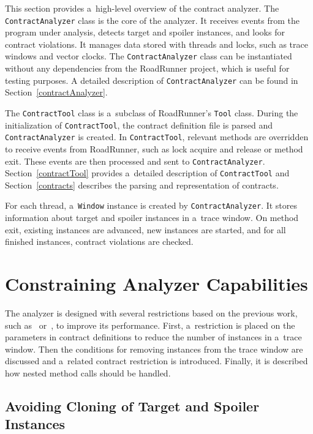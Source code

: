 This section provides a~high-level overview of the contract analyzer. The
\texttt{ContractAnalyzer} class is the core of the analyzer. It receives events
from the program under analysis, detects target and spoiler instances, and looks
for contract violations. It manages data stored with threads and locks, such as
trace windows and vector clocks. The \texttt{ContractAnalyzer} class can be
instantiated without any dependencies from the RoadRunner project, which is
useful for testing purposes. A detailed description of \texttt{ContractAnalyzer}
can be found in Section~\ref{contractAnalyzer}.

The \texttt{ContractTool} class is a~subclass of RoadRunner's \texttt{Tool}
class. During the initialization of \texttt{ContractTool}, the contract
definition file is parsed and \texttt{ContractAnalyzer} is created. In
\texttt{ContractTool}, relevant methods are overridden to receive events from
RoadRunner, such as lock acquire and release or method exit. These events are
then processed and sent to \texttt{ContractAnalyzer}. Section~\ref{contractTool}
provides a~detailed description of \texttt{ContractTool} and
Section~\ref{contracts} describes the parsing and representation of contracts.

For each thread, a~\texttt{Window} instance is created by
\texttt{ContractAnalyzer}. It stores information about target and spoiler
instances in a~trace window. On method exit, existing instances are advanced,
new instances are started, and for all finished instances, contract violations
are checked.

\section{Constraining Analyzer Capabilities}
\label{constraining}

The analyzer is designed with several restrictions based on the previous work,
such as~\cite{janousek} or~\cite{FITPUB10817}, to improve its performance.
First, a~restriction is placed on the parameters in contract definitions to
reduce the number of instances in a~trace window. Then the conditions for
removing instances from the trace window are discussed and a~related contract
restriction is introduced. Finally, it is described how nested method calls
should be handled.

\subsection{Avoiding Cloning of Target and Spoiler Instances}

